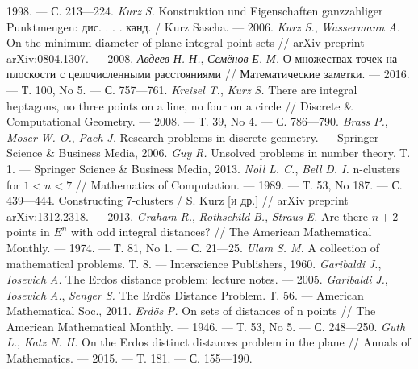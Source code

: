 \begin{thebibliography}{99}
1998. — С. 213—224.
\textsl{Kurz} \textsl{S.} Konstruktion und Eigenschaften
ganzzahliger Punktmengen: дис. . . . канд. / Kurz Sascha. — 2006.
\textsl{Kurz} \textsl{S.}, \textsl{Wassermann} \textsl{A.} On
the minimum diameter of plane integral point sets // arXiv
preprint arXiv:0804.1307. — 2008.
\textsl{Авдеев} \textsl{Н. Н.}, \textsl{Семёнов} \textsl{Е. М.}
О множествах точек на плоскости с целочисленными
расстояниями // Математические заметки. — 2016. — Т. 100,
No 5. — С. 757—761.
\textsl{Kreisel} \textsl{T.}, \textsl{Kurz} \textsl{S.} There are
integral heptagons, no three points on a line, no four on a circle //
Discrete \& Computational Geometry. — 2008. — Т. 39, No 4. —
С. 786—790.
\textsl{Brass} \textsl{P.}, \textsl{Moser} \textsl{W. O.},
\textsl{Pach} \textsl{J.} Research problems in discrete
geometry. — Springer Science \& Business Media, 2006.
\textsl{Guy} \textsl{R.} Unsolved problems in number theory. Т.
1. — Springer Science \& Business Media, 2013.
\textsl{Noll} \textsl{L. C.}, \textsl{Bell} \textsl{D. I.} n-clusters
for $1 < n < 7$ // Mathematics of Computation. — 1989. — Т. 53,
No 187. — С. 439—444.
Constructing 7-clusters / S. Kurz [и др.] // arXiv preprint
arXiv:1312.2318. — 2013.
\textsl{Graham} \textsl{R.}, \textsl{Rothschild} \textsl{B.},
\textsl{Straus} \textsl{E.} Are there $n + 2$ points in $E^n$ with odd
integral distances? // The American Mathematical Monthly. —
1974. — Т. 81, No 1. — С. 21—25.
\textsl{Ulam} \textsl{S. M.} A collection of mathematical
problems. Т. 8. — Interscience Publishers, 1960.
\textsl{Garibaldi} \textsl{J.}, \textsl{Iosevich} \textsl{A.} The
Erdos distance problem: lecture notes. — 2005.
\textsl{Garibaldi} \textsl{J.}, \textsl{Iosevich} \textsl{A.},
\textsl{Senger} \textsl{S.} The Erdös Distance Problem. Т. 56. —
American Mathematical Soc., 2011.
\textsl{Erdös} \textsl{P.} On sets of distances of n points //
The American Mathematical Monthly. — 1946. — Т. 53, No 5. —
С. 248—250.
\textsl{Guth} \textsl{L.}, \textsl{Katz} \textsl{N. H.} On the
Erdos distinct distances problem in the plane // Annals of
Mathematics. — 2015. — Т. 181. — С. 155—190.
\end{thebibliography}
